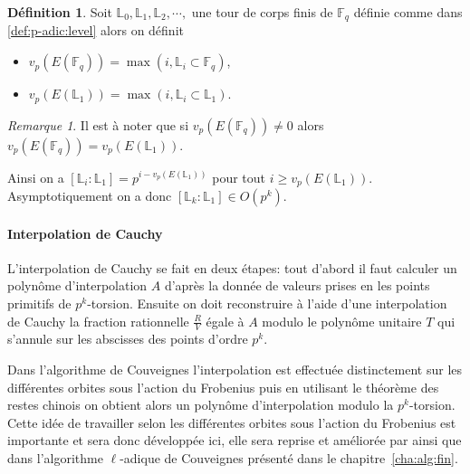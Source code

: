 \documentclass[10pt,a4paper]{book}
\theoremstyle{plain}
\theoremstyle{definition}
\theoremstyle{definition}
\theoremstyle{definition}
\theoremstyle{definition}
\newtheorem{defi}[thm]{Définition}
\theoremstyle{remark}
\newtheorem{rem}[thm]{Remarque}
\theoremstyle{remark}
\theoremstyle{definition}
\begin{document}

\begin{defi}
Soit $\mathbb{L}_0, \mathbb{L}_1, \mathbb{L}_2, \cdots, $ une tour de corps 
finis de $\mathbb{F}_q$ définie comme dans \ref{def:p-adic:level} alors on 
définit
\begin{itemize}
\item $v_p(E(\mathbb{F}_q))=\max\left( i, \mathbb{L}_i \subset \mathbb{F}_q \right)$,
\item $v_p(E(\mathbb{L}_1))=\max\left( i, \mathbb{L}_i \subset \mathbb{L}_1 \right)$.
\end{itemize}
\end{defi}

\begin{rem}
Il est à noter que si $v_p(E(\mathbb{F}_q)) \neq 0$ alors $v_p(E(\mathbb{F}_q))=v_p(E(\mathbb{L}_1))$.
\end{rem}

Ainsi on a $[\mathbb{L}_i:\mathbb{L}_1]=p^{i- v_p(E(\mathbb{L}_1))}$ pour tout $i \geqslant  v_p(E(\mathbb{L}_1))$. Asymptotiquement on a donc $[\mathbb{L}_k:\mathbb{L}_1] \in O(p^k)$.



\paragraph{Interpolation de Cauchy} L'interpolation de Cauchy se fait en deux étapes: tout d'abord il faut calculer un polynôme d'interpolation $A$ d'après la donnée de valeurs prises en les points primitifs de $p^k$-torsion. Ensuite on doit reconstruire à l'aide d'une interpolation de Cauchy la fraction rationnelle $\frac{R}{V}$ égale à $A$ modulo le polynôme unitaire $T$ qui s'annule sur les abscisses des points d'ordre $p^k$. 

Dans l'algorithme de Couveignes \cite{Couveignes96} l'interpolation est 
effectuée distinctement sur les différentes orbites sous l'action du Frobenius 
puis en utilisant le théorème des restes chinois on obtient alors un polynôme 
d'interpolation modulo la $p^k$-torsion. Cette idée de travailler selon les 
différentes orbites sous l'action du Frobenius est importante et sera donc 
développée ici, elle sera reprise et améliorée par \cite{DeFeo11} ainsi que 
dans l'algorithme $\ell$-adique de Couveignes présenté dans le 
chapitre~\ref{cha:alg:fin}.
\end{document}
